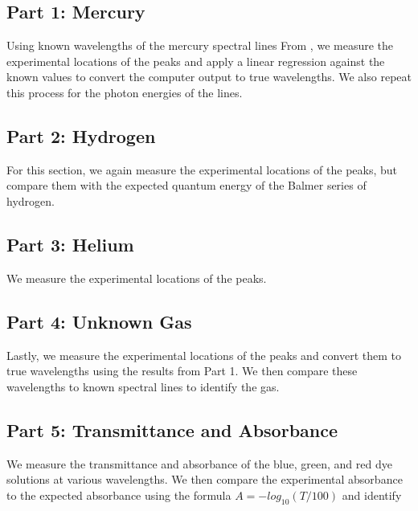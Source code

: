 \subsection{Part 1: Mercury}
Using known wavelengths of the mercury spectral lines From \cite{mercury_spectral_lines}, we measure the experimental locations of the peaks and apply a linear regression against the known values to convert the computer output to true wavelengths. We also repeat this process for the photon energies of the lines.

\subsection{Part 2: Hydrogen}
For this section, we again measure the experimental locations of the peaks, but compare them with the expected quantum energy of the Balmer series of hydrogen.

\subsection{Part 3: Helium}
We measure the experimental locations of the peaks.

\subsection{Part 4: Unknown Gas}
Lastly, we measure the experimental locations of the peaks and convert them to true wavelengths using the results from Part 1. We then compare these wavelengths to known spectral lines to identify the gas.

\subsection{Part 5: Transmittance and Absorbance}
We measure the transmittance and absorbance of the blue, green, and red dye solutions at various wavelengths. We then compare the experimental absorbance to the expected absorbance using the formula $A = -log_{10}(T/100)$ and identify 